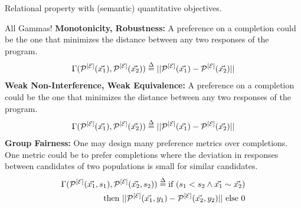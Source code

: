 \begin{frame}{Relational property with (semantic) quantitative objectives.}

\end{frame}

\begin{frame}{All Gammas!}
    \textbf{Monotonicity, Robustness:} A preference on a completion could be the one that minimizes the distance between any two responses of the program.
    \begin{align*}
        \Gamma(\mathcal{P}_{}^{[\mathcal{E}]}(\vec{x_1}), \mathcal{P}_{}^{[\mathcal{E}]}(\vec{x_2})) \overset{\Delta}{=} ||\mathcal{P}_{}^{[\mathcal{E}]}(\vec{x_1}) - \mathcal{P}_{}^{[\mathcal{E}]}(\vec{x_2})||
    \end{align*}
    \textbf{Weak Non-Interference, Weak Equivalence:} A preference on a completion could be the one that minimizes the distance between any two responses of the program.
    \begin{align*}
        \Gamma(\mathcal{P}_{}^{[\mathcal{E}]}(\vec{x_1}), \mathcal{P}_{}^{[\mathcal{E}]}(\vec{x_2})) \overset{\Delta}{=} ||\mathcal{P}_{}^{[\mathcal{E}]}(\vec{x_1}) - \mathcal{P}_{}^{[\mathcal{E}]}(\vec{x_2})||
    \end{align*}
    \textbf{Group Fairness:} One may design many preference metrics over completions. One metric could be to prefer completions where the deviation in responses between candidates of two populations is small for similar candidates.
    \begin{align*}
        \Gamma(\mathcal{P}_{}^{[\mathcal{E}]}(\vec{x_1}, {s_1}), \mathcal{P}_{}^{[\mathcal{E}]}(\vec{x_2}, {s_2})) \overset{\Delta}{=} \textrm{if } (s_1 < s_2 \land \vec{x_1} \sim \vec{x_2})\\ \textrm{ then }||\mathcal{P}_{}^{[\mathcal{E}]}(\vec{x_1}, {y_1}) - \mathcal{P}_{}^{[\mathcal{E}]}(\vec{x_2}, {y_2})|| \textrm{ else } 0
    \end{align*}
\end{frame}
